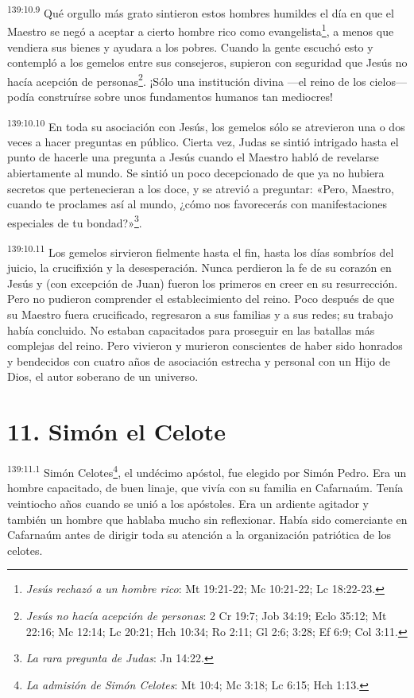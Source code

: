 \par
\textsuperscript{139:10.9} Qué orgullo más grato sintieron estos hombres humildes el día en que el Maestro se negó a aceptar a cierto hombre rico como evangelista\footnote{\textit{Jesús rechazó a un hombre rico}: Mt 19:21-22; Mc 10:21-22; Lc 18:22-23.}, a menos que vendiera sus bienes y ayudara a los pobres. Cuando la gente escuchó esto y contempló a los gemelos entre sus consejeros, supieron con seguridad que Jesús no hacía acepción de personas\footnote{\textit{Jesús no hacía acepción de personas}: 2 Cr 19:7; Job 34:19; Eclo 35:12; Mt 22:16; Mc 12:14; Lc 20:21; Hch 10:34; Ro 2:11; Gl 2:6; 3:28; Ef 6:9; Col 3:11.}. ¡Sólo una institución divina ---el reino de los cielos--- podía construírse sobre unos fundamentos humanos tan mediocres!

\par
\textsuperscript{139:10.10} En toda su asociación con Jesús, los gemelos sólo se atrevieron una o dos veces a hacer preguntas en público. Cierta vez, Judas se sintió intrigado hasta el punto de hacerle una pregunta a Jesús cuando el Maestro habló de revelarse abiertamente al mundo. Se sintió un poco decepcionado de que ya no hubiera secretos que pertenecieran a los doce, y se atrevió a preguntar: «Pero, Maestro, cuando te proclames así al mundo, ¿cómo nos favorecerás con manifestaciones especiales de tu bondad?»\footnote{\textit{La rara pregunta de Judas}: Jn 14:22.}.

\par
\textsuperscript{139:10.11} Los gemelos sirvieron fielmente hasta el fin, hasta los días sombríos del juicio, la crucifixión y la desesperación. Nunca perdieron la fe de su corazón en Jesús y (con excepción de Juan) fueron los primeros en creer en su resurrección. Pero no pudieron comprender el establecimiento del reino. Poco después de que su Maestro fuera crucificado, regresaron a sus familias y a sus redes; su trabajo había concluido. No estaban capacitados para proseguir en las batallas más complejas del reino. Pero vivieron y murieron conscientes de haber sido honrados y bendecidos con cuatro años de asociación estrecha y personal con un Hijo de Dios, el autor soberano de un universo.

\section*{11. Simón el Celote}
\par
\textsuperscript{139:11.1} Simón Celotes\footnote{\textit{La admisión de Simón Celotes}: Mt 10:4; Mc 3:18; Lc 6:15; Hch 1:13.}, el undécimo apóstol, fue elegido por Simón Pedro. Era un hombre capacitado, de buen linaje, que vivía con su familia en Cafarnaúm. Tenía veintiocho años cuando se unió a los apóstoles. Era un ardiente agitador y también un hombre que hablaba mucho sin reflexionar. Había sido comerciante en Cafarnaúm antes de dirigir toda su atención a la organización patriótica de los celotes.

